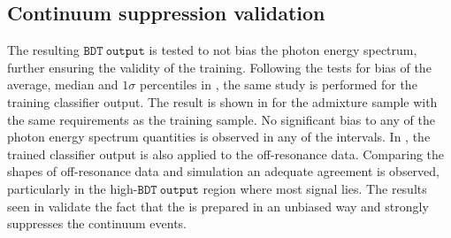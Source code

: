 \subsection{Continuum suppression validation}\label{sec:continuum_validation}

The resulting $\mathtt{BDT~output}$ is tested to not bias the photon energy spectrum, further ensuring the validity of the training.
Following the tests for bias of the average, median and $1\sigma$ percentiles in ,
the same study is performed for the training classifier output.
The result is shown in  for the \BtoXsgamma admixture sample with the same requirements as the training sample.
No significant bias to any of the photon energy spectrum quantities is observed in any of the intervals.
In , the trained classifier output is also applied to the off-resonance data.
Comparing the shapes of off-resonance data and simulation an adequate agreement is observed, particularly in the high-$\mathtt{BDT~output}$ region where most signal lies.
The results seen in  validate the fact that the \BDT is prepared in an unbiased way and strongly suppresses the continuum events.
